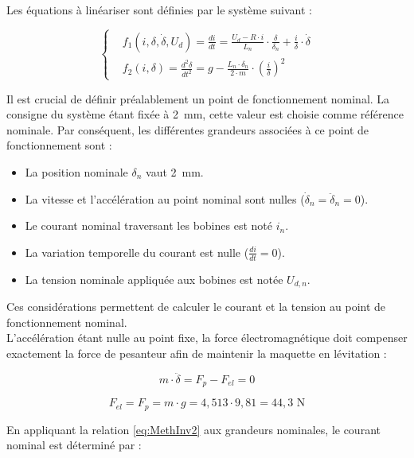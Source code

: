 Les équations à linéariser sont définies par le système suivant :

\begin{equation*}
    \left\{ \begin{aligned}
         & f_1(i, \delta, \dot{\delta}, U_{d}) = \frac{di}{dt} = \frac{U_d - R \cdot i}{L_n} \cdot \frac{\delta}{\delta_n} + \frac{i}{\delta} \cdot \dot{\delta} \\
         & f_2(i, \delta) = \frac{d^2\delta}{dt^2} = g - \frac{L_n \cdot \delta_n}{2 \cdot m} \cdot \left(\frac{i}{\delta}\right)^2
    \end{aligned} \right.
\end{equation*}

Il est crucial de définir préalablement un point de fonctionnement nominal. La consigne du système étant fixée à 2~mm, cette valeur est choisie comme référence nominale. Par conséquent, les différentes grandeurs associées à ce point de fonctionnement sont :

\begin{itemize}
    \item La position nominale $\delta_n$ vaut 2~mm.
    \item La vitesse et l'accélération au point nominal sont nulles ($\dot{\delta}_n = \ddot{\delta}_n = 0$).
    \item Le courant nominal traversant les bobines est noté $i_n$.
    \item La variation temporelle du courant est nulle ($\frac{di}{dt} = 0$).
    \item La tension nominale appliquée aux bobines est notée $U_{d,n}$.
\end{itemize}

Ces considérations permettent de calculer le courant et la tension au point de fonctionnement nominal.\\

L'accélération étant nulle au point fixe, la force électromagnétique doit compenser exactement la force de pesanteur afin de maintenir la maquette en lévitation :

$$m\cdot\ddot{\delta} = F_p - F_{el} = 0$$

\begin{equation}
    F_{el} = F_p = m\cdot g = 4,513 \cdot 9,81 = 44,3 \text{ N}
\end{equation}

En appliquant la relation \ref{eq:MethInv2} aux grandeurs nominales, le courant nominal est déterminé par :

